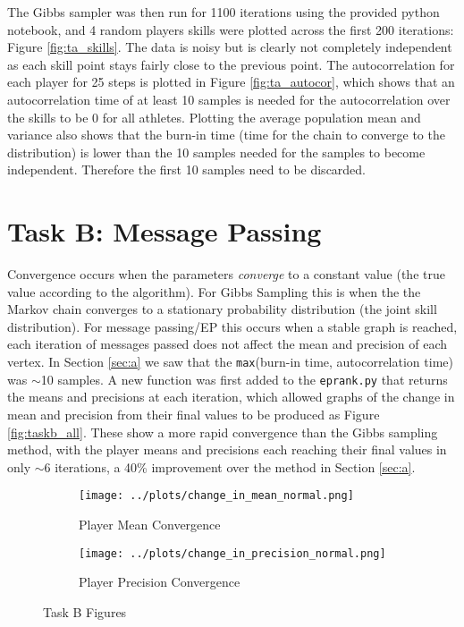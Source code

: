 \documentclass[11pt]{amsart}
\begin{document}
The Gibbs sampler was then run for 1100 iterations using the provided python notebook, and 4 random players skills were plotted across the first 200 iterations: Figure \ref{fig:ta_skills}. The data is noisy but is clearly not completely independent as each skill point stays fairly close to the previous point. The autocorrelation for each player for 25 steps is plotted in Figure \ref{fig:ta_autocor}, which shows that an autocorrelation time of at least 10 samples is needed for the autocorrelation over the skills to be 0 for all athletes. Plotting the average population mean and variance also shows that the burn-in time (time for the chain to converge to the distribution) is lower than the 10 samples needed for the samples to become independent. Therefore the first 10 samples need to be discarded.


\section{Task B: Message Passing} \label{sec:b}
Convergence occurs when the parameters \emph{converge} to a constant value (the true value according to the algorithm). For Gibbs Sampling this is when the the Markov chain converges to a stationary probability distribution (the joint skill distribution). For message passing/EP this occurs when a stable graph is reached, each iteration of messages passed does not affect the mean and precision of each vertex. In Section \ref{sec:a} we saw that the \verb|max|(burn-in time, autocorrelation time) was $\sim$10 samples. A new function was first added to the \verb|eprank.py| that returns the means and precisions at each iteration, which allowed graphs of the change in mean and precision from their final values to be produced as Figure \ref{fig:taskb_all}. These show a more rapid convergence than the Gibbs sampling method, with the player means and precisions each reaching their final values in only $\sim$6 iterations, a 40\% improvement over the method in Section \ref{sec:a}.
\begin{figure}[h]
    \centering
    \begin{subfigure}[b]{0.495\textwidth}
        \centering
        \texttt{[image: ../plots/change\_in\_mean\_normal.png]}
        \caption{Player Mean Convergence}
        \label{fig:tb_means}
    \end{subfigure}
    \hfill
    \begin{subfigure}[b]{0.495\textwidth}
        \centering
        \texttt{[image: ../plots/change\_in\_precision\_normal.png]}
        \caption{Player Precision Convergence}
        \label{fig:tb_precs}
    \end{subfigure}
    \caption{Task B Figures}
\end{figure} \label{fig:taskb_all}
\end{document}

